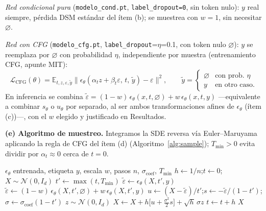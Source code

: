 \documentclass[a4paper,10pt]{article}
\theoremstyle{definition}	\newtheorem*{df}{Definici\'on}
\theoremstyle{definition}	\newtheorem{tm}{Teorema}
\theoremstyle{definition}	\newtheorem*{prop}{Proposición}
\theoremstyle{plain}		\newtheorem*{lema}{Lema}
\theoremstyle{plain}		\newtheorem*{obs}{Observaci\'on}
\theoremstyle{remark}		\newtheorem*{dem}{Demostraci\'on}
\begin{document}
\emph{Red condicional pura} (\texttt{modelo\_cond.pt}, \texttt{label\_dropout=0},
sin token nulo): $y$ real siempre, pérdida DSM estándar del ítem (b); se
muestrea con $w=1$, sin necesitar $\varnothing$.

\emph{Red con CFG} (\texttt{modelo\_cfg.pt}, \texttt{label\_dropout}=$\eta$=0.1,
con token nulo $\varnothing$): $y$ se reemplaza por $\varnothing$ con
probabilidad $\eta$, independiente por muestra (entrenamiento CFG, apunte
MIT):
\[
\mathcal L_{\mathrm{CFG}}(\theta)=\mathbb E_{t,z,\varepsilon,\tilde y}
\big\|\epsilon_\theta(\alpha_t z+\beta_t\varepsilon,\,t,\,\tilde y)-\varepsilon\big\|^2,
\qquad
\tilde y=\begin{cases}\varnothing & \text{con prob. }\eta\\ y & \text{en otro caso.}\end{cases}
\]
En inferencia se combina $\tilde\varepsilon=(1-w)\,\epsilon_\theta(x,t,\varnothing)+w\,\epsilon_\theta(x,t,y)$
—equivalente a combinar $s_\theta$ o $u_\theta$ por separado, al ser ambos
transformaciones afines de $\epsilon_\theta$ (ítem (c))—, con el $w$
elegido y justificado en Resultados.

\smallskip
\noindent\textbf{(e) Algoritmo de muestreo.}
Integramos la SDE reversa vía Euler--Maruyama aplicando la regla de CFG del
ítem (d) (Algoritmo~\ref{alg:sample}); $T_{\min}>0$ evita dividir por
$\alpha_t\approx0$ cerca de $t=0$.

\begin{algorithm}[H]
\caption{Muestreo condicional con CFG (Euler--Maruyama)}
\label{alg:sample}
\small
\begin{algorithmic}[1]
\Require $\epsilon_\theta$ entrenada, etiqueta $y$, escala $w$, pasos $n$, $\sigma_{\mathrm{coef}}$, $T_{\min}$
\State $h\leftarrow 1/n$;\quad $t\leftarrow 0$;\quad $X\sim\mathcal N(0,I_d)$
  \State $t'\leftarrow\max(t,T_{\min})$
    \State $\tilde\varepsilon\leftarrow\epsilon_\theta(X,t',y)$
  \Else
    \State $\tilde\varepsilon\leftarrow(1-w)\,\epsilon_\theta(X,t',\varnothing)+w\,\epsilon_\theta(X,t',y)$
  \EndIf
  \State $u\leftarrow(X-\tilde\varepsilon)/t'$;\quad $s\leftarrow-\tilde\varepsilon/(1-t')$;\quad $\sigma\leftarrow\sigma_{\mathrm{coef}}(1-t')$
  \State $z\sim\mathcal N(0,I_d)$
  \State $X\leftarrow X+h\big[u+\tfrac{\sigma^2}{2}s\big]+\sqrt{h}\,\sigma z$
  \State $t\leftarrow t+h$
\EndFor
\State \Return $X$
\end{algorithmic}
\end{algorithm}
\end{document}
